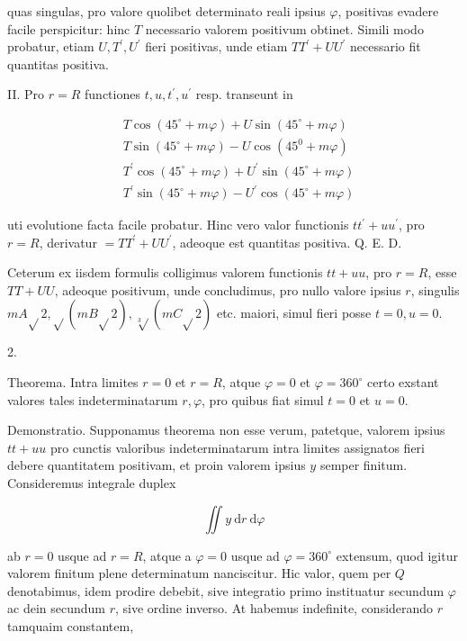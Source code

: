 \documentclass[10pt]{article}
\begin{document}
quas singulas, pro valore quolibet determinato reali ipsius \(\varphi\), positivas evadere facile perspicitur: hinc \(T\) necessario valorem positivum obtinet. Simili modo probatur, etiam \(U, T^{\prime}, U^{\prime}\) fieri positivas, unde etiam \(T T^{\prime}+U U^{\prime}\) necessario fit quantitas positiva.

II. Pro \(r=R\) functiones \(t, u, t^{\prime}, u^{\prime}\) resp. transeunt in

\[
\begin{aligned}
& T \cos \left(45^{\circ}+m \varphi\right)+U \sin \left(45^{\circ}+m \varphi\right) \\
& T \sin \left(45^{\circ}+m \varphi\right)-U \cos \left(45^{0}+m \varphi\right) \\
& T^{\prime} \cos \left(45^{\circ}+m \varphi\right)+U^{\prime} \sin \left(45^{\circ}+m \varphi\right) \\
& T^{\prime} \sin \left(45^{\circ}+m \varphi\right)-U^{\prime} \cos \left(45^{\circ}+m \varphi\right)
\end{aligned}
\]

uti evolutione facta facile probatur. Hinc vero valor functionis \(t t^{\prime}+u u^{\prime}\), pro \(r=R\), derivatur \(=T T^{\prime}+U U^{\prime}\), adeoque est quantitas positiva. Q. E. D.

Ceterum ex iisdem formulis colligimus valorem functionis \(t t+u u\), pro \(r=R\), esse \(T T+U U\), adeoque positivum, unde concludimus, pro nullo valore ipsius \(r\), singulis \(m A \sqrt{ } 2, \sqrt{ }(m B \sqrt{ } 2), \sqrt[3]{ }(m C \sqrt{ } 2)\) etc. maiori, simul fieri posse \(t=0, u=0\).

2.

Theorema. Intra limites \(r=0\) et \(r=R\), atque \(\varphi=0\) et \(\varphi=360^{\circ}\) certo exstant valores tales indeterminatarum \(r, \varphi\), pro quibus fiat simul \(t=0\) et \(u=0\).

Demonstratio. Supponamus theorema non esse verum, patetque, valorem ipsius \(t t+u u\) pro cunctis valoribus indeterminatarum intra limites assignatos fieri debere quantitatem positivam, et proin valorem ipsius \(y\) semper finitum. Consideremus integrale duplex

\[
\iint y \mathrm{~d} r \mathrm{~d} \varphi
\]

ab \(r=0\) usque ad \(r=R\), atque a \(\varphi=0\) usque ad \(\varphi=360^{\circ}\) extensum, quod igitur valorem finitum plene determinatum nanciscitur. Hic valor, quem
per \(Q\) denotabimus, idem prodire debebit, sive integratio primo instituatur secundum \(\varphi\) ac dein secundum \(r\), sive ordine inverso. At habemus indefinite, considerando \(r\) tamquaim constantem,
\end{document}
